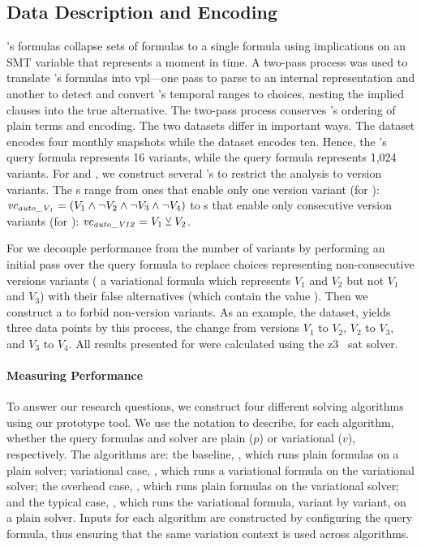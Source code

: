 \subsection{Data Description and Encoding}%
\label{section:exper-meth:description}
% 
%
\nieke{}'s formulas collapse sets of \pl{} formulas to a single formula using
implications on an SMT variable that represents a moment in time. A two-pass
process was used to translate \nieke{}'s formulas into \ac{vpl}---one pass to
parse to an internal representation and another to detect and convert \nieke{}'s
temporal ranges to choices, nesting the implied clauses into the true
alternative. The two-pass process conserves \nieke{}'s ordering of plain terms
and encoding. The two datasets differ in important ways. The \auto{} dataset
encodes four monthly snapshots while the \fin{} dataset encodes ten. Hence, the
\auto{}'s query formula represents 16 variants, while the \fin{} query formula
represents 1,024 variants. For  and , we construct several
\vc{}'s to restrict the analysis to version variants. The \vc{}s range from ones
that enable only one version variant (for ): $\mathit{vc_{\mathit{auto\_V_{1}}}}
= (V_{1} \wedge \neg V_{2} \wedge \neg V_{3} \wedge \neg V_{4})$ to \vc{}s that
enable only consecutive version variants (for ):
$\mathit{vc_{\mathit{auto\_V12}}} = V_{1} \veebar V_{2}$.

For  we decouple performance from the number of variants by performing
an initial pass over the query formula to replace choices representing
non-consecutive versions variants (\eg{} a variational formula which represents
$V_{1}$ and $V_{2}$ but not $V_{1}$ and $V_{3}$) with their false alternatives
(which contain the value \tru{}). Then we construct a \vc{} to forbid
non-version variants. As an example, the \auto{} dataset, yields three data
points by this process, the change from versions $V_{1}$ to $V_{2}$, $V_{2}$ to
$V_{3}$, and $V_{3}$ to $V_{4}$. All results presented for  were
  calculated using the z3~{\citep{10.1007/978-3-540-78800-3_24}} \ac{sat}
  solver.

\paragraph{Measuring Performance}%
\label{section:exper-meth:perf}
%
To answer our research questions, we construct four different solving
algorithms using our prototype tool. We use the notation
 to describe, for each algorithm, whether the query
formulas and solver are plain ($p$) or variational ($v$), respectively.
%
The algorithms are: the baseline, \pTop{}, which runs plain formulas on a plain
solver; variational case, \vTov{}, which runs a variational formula on the
variational solver; the overhead case, \pTov{}, which runs plain formulas on the
variational solver; and the typical case, \vTop{}, which runs the variational
formula, variant by variant, on a plain solver. Inputs for each algorithm are
constructed by configuring the query formula, thus ensuring that the same
variation context is used across algorithms.

